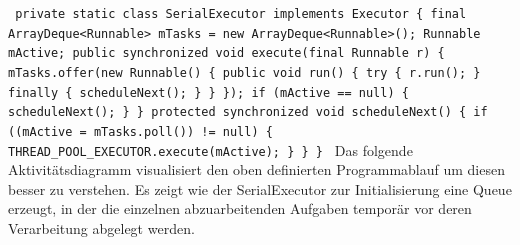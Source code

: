 \documentclass[12pt,oneside,a4paper,bibtotoc,liststotoc]{scrreprt}
\begin{document}
\texttt{\newline
private static class SerialExecutor implements Executor \{\newline
    final ArrayDeque<Runnable> mTasks = new ArrayDeque<Runnable>();\newline
    Runnable mActive;\newline
\newline
    public synchronized void execute(final Runnable r) \{\newline
        mTasks.offer(new Runnable() \{\newline
            public void run() \{\newline
                try \{\newline
                    r.run();\newline
                \} finally \{\newline
                    scheduleNext();\newline
                \}\newline
            \}\newline
        \});\newline
        if (mActive == null) \{\newline
            scheduleNext();\newline
        \}\newline
    \}\newline
        protected synchronized void scheduleNext() \{\newline
        if ((mActive = mTasks.poll()) != null) \{\newline
            THREAD\_POOL\_EXECUTOR.execute(mActive);\newline
        \}\newline
    \}\newline
\}\newline
}\newline
Das folgende Aktivitätsdiagramm visualisiert den oben definierten Programmablauf um diesen besser zu verstehen. Es zeigt wie der SerialExecutor zur Initialisierung eine Queue erzeugt, in der die einzelnen abzuarbeitenden Aufgaben temporär vor deren Verarbeitung abgelegt werden.
\end{document}
